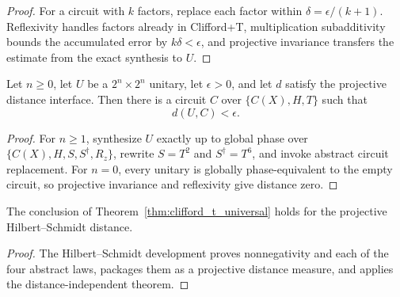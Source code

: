 \begin{proof}
  \leanok
  For a circuit with $k$ factors, replace each factor within
  $\delta=\epsilon/(k+1)$.  Reflexivity handles factors already in
  Clifford+T, multiplication subadditivity bounds the accumulated error by
  $k\delta<\epsilon$, and projective invariance transfers the estimate
  from the exact synthesis to $U$.
\end{proof}

\begin{theorem}
  \label{thm:clifford_t_universal}
  \leanok
  Let $n\geq0$, let $U$ be a $2^n\times2^n$ unitary, let $\epsilon>0$, and
  let $d$ satisfy the projective distance interface.  Then there is a circuit
  $C$ over $\{C(X),H,T\}$ such that
  \[
    d(U,C)<\epsilon.
  \]
\end{theorem}

\begin{proof}
  \leanok
  For $n\geq1$, synthesize $U$ exactly up to global phase over
  $\{C(X),H,S,S^\dagger,R_z\}$, rewrite $S=T^2$ and $S^\dagger=T^6$, and
  invoke abstract circuit replacement.  For $n=0$, every unitary is globally
  phase-equivalent to the empty circuit, so projective invariance and
  reflexivity give distance zero.
\end{proof}

\begin{corollary}
  \label{cor:clifford_t_universal_hs}
  \leanok
  The conclusion of Theorem~\ref{thm:clifford_t_universal} holds for the
  projective Hilbert--Schmidt distance.
\end{corollary}

\begin{proof}
  \leanok
  The Hilbert--Schmidt development proves nonnegativity and each of the four
  abstract laws, packages them as a projective distance measure, and applies
  the distance-independent theorem.
\end{proof}
